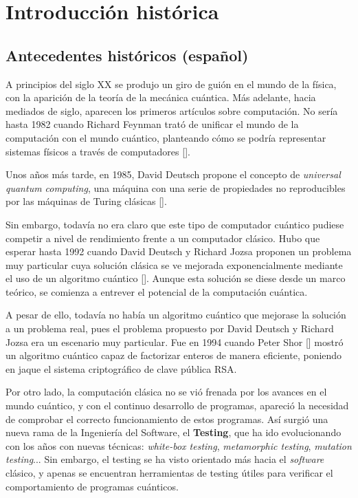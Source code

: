 \chapter{Introducción histórica}

\section{Antecedentes históricos (español)}
A principios del siglo XX se produjo un giro de guión en el mundo de la física, con la aparición de la teoría de la mecánica cuántica. Más adelante, hacia mediados de siglo, aparecen los primeros artículos sobre computación. No sería hasta 1982 cuando Richard Feynman trató de unificar el mundo de la computación con el mundo cuántico, planteando cómo se podría representar sistemas físicos a través de computadores [\cite{feynman1982simulating}].

Unos años más tarde, en 1985, David Deutsch propone el concepto de \textit{universal quantum computing}, una máquina con una serie de propiedades no reproducibles por las máquinas de Turing clásicas [\cite{deutsch1985quantum}].

Sin embargo, todavía no era claro que este tipo de computador cuántico pudiese competir a nivel de rendimiento frente a un computador clásico. Hubo que esperar hasta 1992 cuando David Deutsch y Richard Jozsa proponen un problema muy particular cuya solución clásica se ve mejorada exponencialmente mediante el uso de un algoritmo cuántico [\cite{deutsch1992rapid}]. Aunque esta solución se diese desde un marco teórico, se comienza a entrever el potencial de la computación cuántica.

A pesar de ello, todavía no había un algoritmo cuántico que mejorase la solución a un problema real, pues el problema propuesto por David Deutsch y Richard Jozsa era un escenario muy particular. Fue en 1994 cuando Peter Shor [\cite{shor1994algorithms}] mostró un algoritmo cuántico capaz de factorizar enteros de manera eficiente, poniendo en jaque el sistema criptográfico de clave pública RSA.

Por otro lado, la computación clásica no se vió frenada por los avances en el mundo cuántico, y con el continuo desarrollo de programas, apareció la necesidad de comprobar el correcto funcionamiento 
de estos programas. Así surgió una nueva rama de la Ingeniería del Software, el \textbf{Testing}, que ha ido evolucionando con los años con nuevas técnicas: \textit{white-box testing}, \textit{metamorphic testing}, \textit{mutation testing}... Sin embargo, el testing se ha visto orientado más hacia el \textit{software} clásico, y apenas se encuentran herramientas de testing útiles para verificar el comportamiento de programas cuánticos. 

